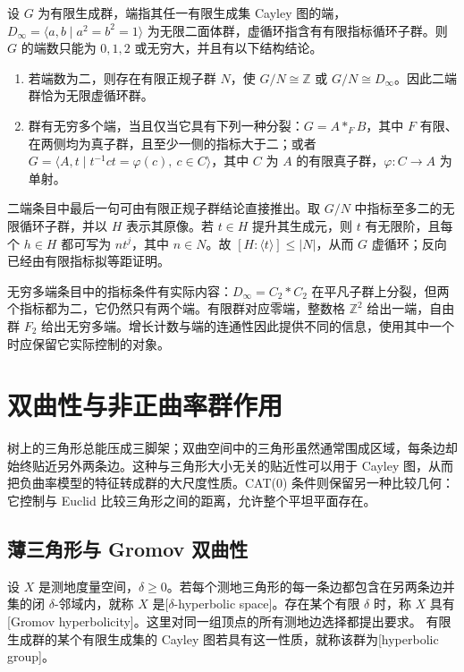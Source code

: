 \begin{theorem}\label{g3:thm:D-stallings-ends}
	设 \(G\) 为有限生成群，端指其任一有限生成集 Cayley 图的端，\(D_\infty=\langle a,b\mid a^2=b^2=1\rangle\) 为无限二面体群，虚循环指含有有限指标循环子群。则 \(G\) 的端数只能为 \(0,1,2\) 或无穷大，并且有以下结构结论。
	\begin{enumerate}
		\item 若端数为二，则存在有限正规子群 \(N\)，使 \(G/N\cong\mathbb Z\) 或 \(G/N\cong D_\infty\)。因此二端群恰为无限虚循环群。
		\item 群有无穷多个端，当且仅当它具有下列一种分裂：\(G=A*_F B\)，其中 \(F\) 有限、在两侧均为真子群，且至少一侧的指标大于二；或者 \(G=\langle A,t\mid t^{-1}ct=\varphi(c),\ c\in C\rangle\)，其中 \(C\) 为 \(A\) 的有限真子群，\(\varphi:C\to A\) 为单射。
	\end{enumerate}
\end{theorem}

二端条目中最后一句可由有限正规子群结论直接推出。取 \(G/N\) 中指标至多二的无限循环子群，并以 \(H\) 表示其原像。若 \(t\in H\) 提升其生成元，则 \(t\) 有无限阶，且每个 \(h\in H\) 都可写为 \(nt^j\)，其中 \(n\in N\)。故 \([H:\langle t\rangle]\le|N|\)，从而 \(G\) 虚循环；反向已经由有限指标拟等距证明。

\ProseParagraphBreak

无穷多端条目中的指标条件有实际内容：\(D_\infty=C_2*C_2\) 在平凡子群上分裂，但两个指标都为二，它仍然只有两个端。有限群对应零端，整数格 \(\mathbb Z^2\) 给出一端，自由群 \(F_2\) 给出无穷多端。增长计数与端的连通性因此提供不同的信息，使用其中一个时应保留它实际控制的对象。

\section{双曲性与非正曲率群作用}
\label{g3:sec:D03}

树上的三角形总能压成三脚架；双曲空间中的三角形虽然通常围成区域，每条边却始终贴近另外两条边。这种与三角形大小无关的贴近性可以用于 Cayley 图，从而把负曲率模型的特征转成群的大尺度性质。CAT(0) 条件则保留另一种比较几何：它控制与 Euclid 比较三角形之间的距离，允许整个平坦平面存在。

\subsection{薄三角形与 Gromov 双曲性}
\label{g3:subsec:D03:01}

\begin{definition}\label{g3:def:D-hyperbolicity}
	设 \(X\) 是测地度量空间，\(\delta\ge0\)。若每个测地三角形的每一条边都包含在另两条边并集的闭 \(\delta\)-邻域内，就称 \(X\) 是[\(\delta\)-hyperbolic space]。存在某个有限 \(\delta\) 时，称 \(X\) 具有[Gromov hyperbolicity]。这里对同一组顶点的所有测地边选择都提出要求。
	有限生成群的某个有限生成集的 Cayley 图若具有这一性质，就称该群为[hyperbolic group]。
\end{definition}

